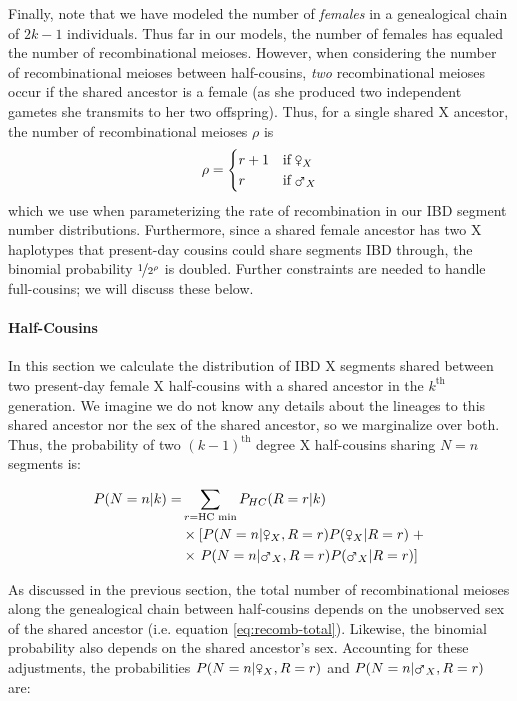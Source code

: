 \documentclass[9pt,twocolumn,twoside]{gsajnl}
\newcommand{\msxa}{\mars_X}
\newcommand{\fsxa}{\venus_X}
\begin{document}
Finally, note that we have modeled the number of \emph{females} in a
genealogical chain of $2k-1$ individuals. Thus far in our models, the number of
females has equaled the number of recombinational meioses. However, when
considering the number of recombinational meioses between half-cousins,
\emph{two} recombinational meioses occur if the shared ancestor is a female (as
she produced two independent gametes she transmits to her two offspring). Thus,
for a single shared X ancestor, the number of recombinational meioses $\rho$ is
%
\begin{equation}
  \rho = \begin{cases}
        r + 1 & \text{if} \; \fsxa\\
        r & \text{if} \; \msxa\\
      \end{cases}
\label{eq:recomb-total}
\end{equation}
%
which we use when parameterizing the rate of recombination in our IBD segment
number distributions. Furthermore, since a shared female ancestor has two X
haplotypes that present-day cousins could share segments IBD through, the
binomial probability $\nicefrac{1}{2^\rho}$ is doubled. Further constraints are
needed to handle full-cousins; we will discuss these below.

\paragraph{Half-Cousins}
\label{p:ibd-seg-num-x}

In this section we calculate the distribution of IBD X segments shared between
two present-day female X half-cousins with a shared ancestor in the $k^\text{th}$
generation. We imagine we do not know any details about the lineages to this
shared ancestor nor the sex of the shared ancestor, so we marginalize over
both. Thus, the probability of two $(k-1)^\text{th}$ degree X half-cousins
sharing $N=n$ segments is:

\begin{align}
  \label{eq:prob-n-half-cousins}
  P(N=n | k)  =& \sum_{r=\text{HC min}} P_{HC}(R=r | k) \\ \nonumber 
  &\times \left[  P(N = n | \fsxa, R=r) P(\fsxa | R=r) \; + \right. \nonumber \\
  &\times \left. P(N = n | \msxa, R=r) P(\msxa | R=r) \right]
\end{align}

As discussed in the previous section, the total number of recombinational
meioses along the genealogical chain between half-cousins depends on the
unobserved sex of the shared ancestor (i.e. equation \eqref{eq:recomb-total}).
Likewise, the binomial probability also depends on the shared ancestor's sex.
Accounting for these adjustments, the probabilities $P(N = n | \fsxa, R=r)$ and
$P(N = n | \msxa, R=r)$ are:
\end{document}
